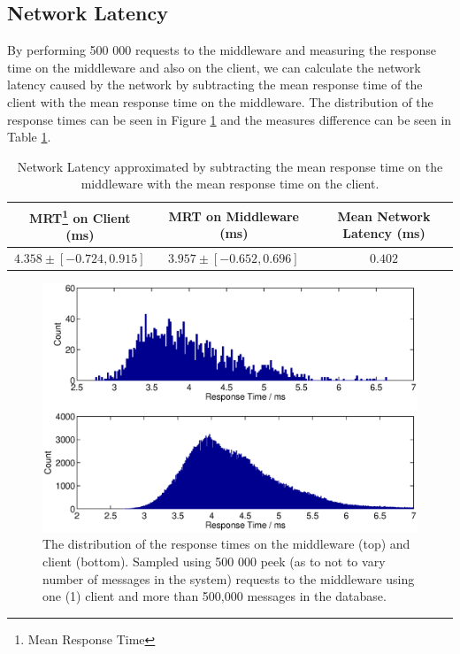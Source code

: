 \documentclass{article}
\begin{document}
        \subsection{Network Latency}
        \label{sec:network_latency}
        By performing 500 000 requests to the middleware and measuring the response time on the middleware and also on the client, we can calculate the network latency caused by the network by subtracting the mean response time of the client with the mean response time on the middleware. The distribution of the response times can be seen in Figure \ref{fig:responsetime_dist_mw_and_client} and the measures difference can be seen in Table \ref{table:network_latency}.

            \begin{table}
                \begin{tabular}{|c|c|c|}
                    \hline 
                        MRT\footnote{Mean Response Time} on Client (ms) & MRT on Middleware (ms) & Mean Network Latency (ms)\\
                    \hline 
                        $4.358 \pm [-0.724, 0.915]$ & $3.957 \pm [-0.652, 0.696]$ & $0.402$ \\ 
                    \hline 
                \end{tabular} 
                \caption{Network Latency approximated by subtracting the mean response time on the middleware with the mean response time on the client.}
                \label{table:network_latency}
        \end{table}

        
        \begin{figure}[H]
                \centerline{\includegraphics[scale=0.50]{responsetime_dist_mw_and_client}}
                \caption{The distribution of the response times on the middleware (top) and client (bottom). Sampled using 500 000 peek (as to not to vary number of messages in the system) requests to the middleware using one (1) client and more than 500,000 messages in the database.}
                \label{fig:responsetime_dist_mw_and_client}
        \end{figure}
            
\end{document}
